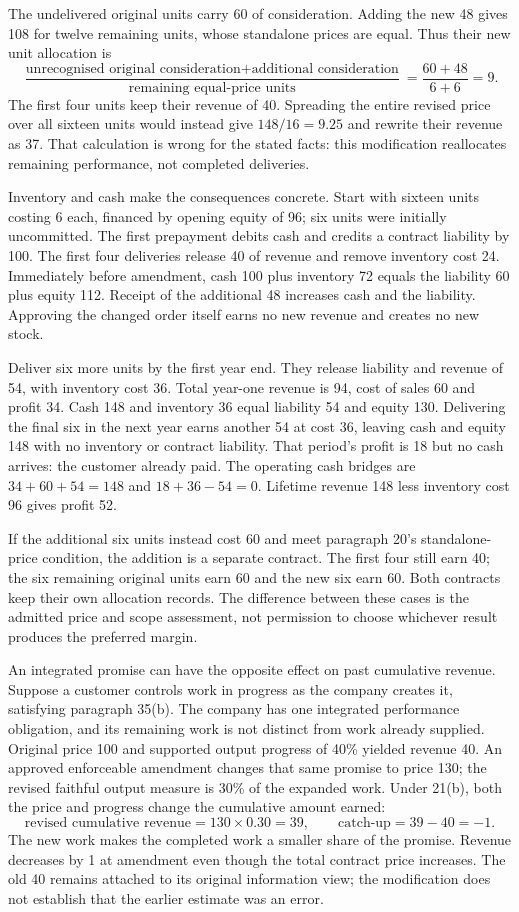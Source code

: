 The undelivered original units carry 60 of consideration. Adding the new 48
gives 108 for twelve remaining units, whose standalone prices are equal.
Thus their new unit allocation is
\[
 \frac{\text{unrecognised original consideration}
       +\text{additional consideration}}
      {\text{remaining equal-price units}}
 =\frac{60+48}{6+6}=9.
\]
The first four units keep their revenue of 40. Spreading the entire revised
price over all sixteen units would instead give $148/16=9.25$ and rewrite
their revenue as 37. That calculation is wrong for the stated facts: this
modification reallocates remaining performance, not completed deliveries.

Inventory and cash make the consequences concrete. Start with sixteen units
costing 6 each, financed by opening equity of 96; six units were initially
uncommitted. The first prepayment debits cash and credits a contract liability
by 100. The first four deliveries release 40 of revenue and remove inventory
cost 24. Immediately before amendment, cash 100 plus inventory 72 equals the
liability 60 plus equity 112. Receipt of the additional 48 increases cash
and the liability. Approving the changed order itself earns no new revenue
and creates no new stock.

Deliver six more units by the first year end. They release liability and
revenue of 54, with inventory cost 36. Total year-one revenue is 94, cost
of sales 60 and profit 34. Cash 148 and inventory 36 equal liability 54
and equity 130. Delivering the final six in the next year earns another
54 at cost 36, leaving cash and equity 148 with no inventory or contract
liability. That period's profit is 18 but no cash arrives: the customer
already paid. The operating cash bridges are $34+60+54=148$ and
$18+36-54=0$. Lifetime revenue 148 less inventory cost 96 gives profit 52.

If the additional six units instead cost 60 and meet paragraph 20's
standalone-price condition, the addition is a separate contract. The first
four still earn 40; the six remaining original units earn 60 and the new
six earn 60. Both contracts keep their own allocation records. The difference
between these cases is the admitted price and scope assessment, not permission
to choose whichever result produces the preferred margin.

An integrated promise can have the opposite effect on past cumulative
revenue. Suppose a customer controls work in progress as the company creates
it, satisfying paragraph 35(b). The company has one integrated performance
obligation, and its remaining work is not distinct from work already supplied.
Original price 100 and supported output progress of 40\% yielded revenue 40.
An approved enforceable amendment changes that same promise to price 130;
the revised faithful output measure is 30\% of the expanded work. Under
21(b), both the price and progress change the cumulative amount earned:
\[
 \text{revised cumulative revenue}=130\times0.30=39,
 \qquad \text{catch-up}=39-40=-1.
\]
The new work makes the completed work a smaller share of the promise.
Revenue decreases by 1 at amendment even though the total contract price
increases. The old 40 remains attached to its original information view;
the modification does not establish that the earlier estimate was an error.

